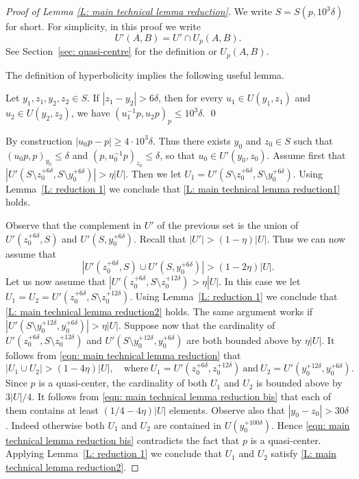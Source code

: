\begin{proof}[Proof of Lemma \ref{L: main technical lemma reduction}]
We write $S=S(p,10^3 \delta)$ for short.
For simplicity, in this proof we write
\[
U'(A,B) = U' \cap U_p(A,B).
\]
See Section~\ref{sec: quasi-centre} for the definition or $U_p(A,B)$.

The definition of hyperbolicity implies the following useful lemma.

\begin{lem}
\label{L: reduction 1}
Let $y_1,z_1,y_2,z_2\in S$.
If $|z_1-y_2|>6\delta$, then for every $u_1 \in U(y_1, z_1)$ and $u_2 \in U(y_2,z_2)$, we have $ (u_1^{-1}p,u_2p)_p\leqslant 10^3 \delta$. \qed
\end{lem}

By construction $|u_0p - p| \geq 4\cdot 10^3\delta$.
Thus there exists $y_0$ and $z_0 \in S$ such that $(u_0p,p)_{y_0}\leqslant \delta$ and $(p,u_0^ {-1}p)_{z_0}\leq \delta$, so that $u_0 \in U'(y_0, z_0)$.
Assume first that \hbox{$|U'(S\setminus z_0^{+6\delta},S\setminus y_0^ {+6\delta})|>\eta|U|$}.
Then we let $U_1 = U'(S\setminus z_0^{+6\delta},S\setminus y_0^ {+6\delta})$.
Using Lemma~\ref{L: reduction 1} we conclude that \eqref{L: main technical lemma reduction1} holds.

Observe that the complement in $U'$ of the previous set is the union of $U'(z_0^{+6\delta}, S)$ and $U'(S,y_0^ {+6\delta})$.
Recall that $|U'| > (1 -\eta)|U|$.
Thus we can now assume that
\begin{equation}
\label{eqn: main technical lemma reduction}
\left| U'(z_0^{+6\delta}, S) \cup U'(S,y_0^ {+6\delta}) \right| > (1-2\eta)|U|.
\end{equation}
Let us now assume that $|U'(z_0^{+6\delta}, S\setminus z_0^{+12\delta}) > \eta |U|$.
In this case we let $U_1 = U_2 = U'(z_0^{+6\delta}, S\setminus z_0^{+12\delta})$.
Using Lemma~\ref{L: reduction 1} we conclude that \eqref{L: main technical lemma reduction2} holds.
The same argu\-ment works if $|U'(S\setminus y_0^ {+12\delta},y_0^ {+6\delta})| > \eta|U|$.
Suppose now that the cardinality of \hbox{$U'(z_0^{+6\delta}, S\setminus z_0^{+12\delta})$} and $U'(S\setminus y_0^ {+12\delta},y_0^ {+6\delta})$ are both bounded above by $\eta |U|$.
It follows from \eqref{eqn: main technical lemma reduction} that
\begin{equation}
\label{eqn: main technical lemma reduction bis}
\left| U_1 \cup U_2 \right| > (1-4\eta)|U|, \quad
\text{where}\ U_1 \!=\! U'(z_0^{+6\delta}, z_0^{+12\delta})\ \text{and}\ U_2 \!=\! U'(y_0^ {+12\delta},y_0^ {+6\delta}).
\end{equation}
Since $p$ is a quasi-center, the cardinality of both $U_1$ and $U_2$ is bounded above by $3|U|/4$.
It follows from \eqref{eqn: main technical lemma reduction bis} that each of them contains at least $(1/4 - 4\eta)|U|$ elements.
Observe also that $|y_0 - z_0| > 30\delta$.
Indeed otherwise both $U_1$ and $U_2$ are contained in $U(y_0^{+100\delta})$.
Hence \eqref{eqn: main technical lemma reduction bis} contradicts the fact that $p$ is a quasi-center.
Applying Lemma~\ref{L: reduction 1} we conclude that $U_1$ and $U_2$ satisfy \eqref{L: main technical lemma reduction2}.
\end{proof}

